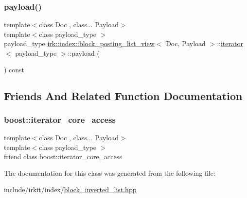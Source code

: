 \mbox{\label{classirk_1_1index_1_1block__posting__list__view_1_1iterator_a8bf0051cfe9dfef27c3a7a627ad51987}} 
\subsubsection{\texorpdfstring{payload()}{payload()}}
{\footnotesize\ttfamily template$<$class Doc , class... Payload$>$ \\
template$<$class payload\+\_\+type $>$ \\
payload\+\_\+type \mbox{\hyperlink{classirk_1_1index_1_1block__posting__list__view}{irk\+::index\+::block\+\_\+posting\+\_\+list\+\_\+view}}$<$ Doc, Payload $>$\+::\mbox{\hyperlink{classirk_1_1index_1_1block__posting__list__view_1_1iterator}{iterator}}$<$ payload\+\_\+type $>$\+::payload (\begin{DoxyParamCaption}{ }\end{DoxyParamCaption}) const\hspace{0.3cm}{\ttfamily [inline]}}



\subsection{Friends And Related Function Documentation}
\mbox{\label{classirk_1_1index_1_1block__posting__list__view_1_1iterator_ac09f73e325921cc50ebcd96bed0f8096}} 
\subsubsection{\texorpdfstring{boost\+::iterator\+\_\+core\+\_\+access}{boost::iterator\_core\_access}}
{\footnotesize\ttfamily template$<$class Doc , class... Payload$>$ \\
template$<$class payload\+\_\+type $>$ \\
friend class boost\+::iterator\+\_\+core\+\_\+access\hspace{0.3cm}{\ttfamily [friend]}}



The documentation for this class was generated from the following file\+:\begin{DoxyCompactItemize}
\item 
include/irkit/index/\mbox{\hyperlink{block__inverted__list_8hpp}{block\+\_\+inverted\+\_\+list.\+hpp}}\end{DoxyCompactItemize}
